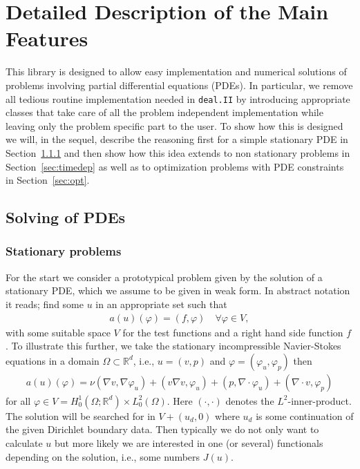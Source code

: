 \documentclass[prodmode,acmtoms]{acmsmall}
\numberwithin{equation}{section}
\newcommand{\R}{\mathbb{R}}
\renewcommand{\phi}{\varphi}
\newcommand{\deal}{\texttt{deal.II}}
\begin{document}
\section{Detailed Description of the Main Features}
\label{detailed_description}
This library is designed to allow easy implementation and numerical solutions 
of problems involving partial differential equations (PDEs). 
In particular, we remove all tedious routine implementation needed in 
\deal{} by introducing appropriate classes that take care of all the 
problem independent implementation while leaving only the problem specific 
part to the user. To show how this is designed we will, in the sequel, 
describe the reasoning first for a simple stationary PDE in 
Section~\ref{subsubsec:stationary problems} and then show
how this idea extends to non stationary problems in 
Section~\ref{sec:timedep} as well as to optimization
problems with PDE constraints in Section~\ref{sec:opt}. 

\subsection{Solving of PDEs}
\subsubsection{Stationary problems}\label{subsubsec:stationary problems}
For the start we consider a prototypical problem given by the solution of 
a stationary PDE, which we assume to be given in weak form.
In abstract notation it reads; find some $u$ in an appropriate set
such that
\begin{align}\label{eq:prototype_weak}
a(u)(\phi) = (f,\phi) \quad \forall \phi \in V,
\end{align}
with some suitable space $V$ for the test functions and a 
right hand side function $f$.
To illustrate this further, we take the stationary 
incompressible Navier-Stokes equations in a domain $\Omega \subset \R^d$, 
i.e., $u = (v,p)$ and $\phi = (\phi_u,\phi_p)$ then
\begin{align}\label{eq:ns}
a(u)(\phi) = \nu(\nabla v, \nabla\phi_u) + (v \nabla v,\phi_u) + (p, \nabla \cdot \phi_u) + (\nabla \cdot v ,\phi_p)
\end{align}
for all $\phi \in V = H^1_0(\Omega;\R^d) \times L^2_0(\Omega)$.
Here $(\cdot,\cdot)$ denotes the $L^2$-inner-product.
The solution will be searched for in $V + (u_d,0)$ where $u_d$ is some 
continuation of the given Dirichlet boundary data.
Then typically we do not only want to calculate $u$ but more likely we are 
interested in one (or several) functionals depending on the solution, i.e., some numbers $J(u)$.
\end{document}
